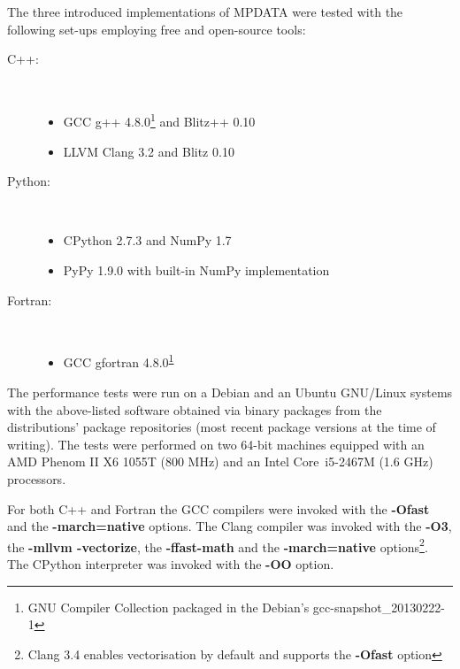 \documentclass[twocolumn]{article}
\newcommand{\prog}[1]{{\rm\bf#1}}
\begin{document}
  The three introduced implementations of MPDATA were tested with the following set-ups 
    employing free and open-source tools:
  \begin{description}
    \item[C++:]{~
      \begin{itemize}
        \item{GCC g++ 4.8.0\footnote{\label{fnt:gcc-snapshot}GNU Compiler Collection packaged in the Debian's gcc-snapshot\_20130222-1} 
          and Blitz++ 0.10}
        \item{LLVM Clang 3.2 and Blitz 0.10}
      \end{itemize}
    }
    \item[Python:]{~
      \begin{itemize}
        \item{CPython 2.7.3 and NumPy 1.7}
        \item{PyPy 1.9.0 with built-in NumPy implementation}
      \end{itemize}
    }
    \item[Fortran:]{~
      \begin{itemize}
        \item{GCC gfortran 4.8.0\textsuperscript{\ref{fnt:gcc-snapshot}}}
      \end{itemize}
    }
  \end{description}
  The performance tests were run on a Debian and an Ubuntu GNU/Linux systems with the above-listed software obtained 
    via binary packages from the distributions' package repositories (most recent package versions at the time of writing).
  The tests were performed on two 64-bit machines equipped with
    an AMD Phenom\textsuperscript{\texttrademark} II X6 1055T (800 MHz)
    and an Intel\textsuperscript{\textregistered} Core\textsuperscript{\texttrademark}~i5-2467M (1.6 GHz)
    processors.

  For both C++ and Fortran the GCC compilers were invoked with the \prog{-Ofast} and the 
    \prog{-march=native} options.
  The Clang compiler was invoked with the \prog{-O3}, the \prog{-mllvm -vectorize}, the \prog{-ffast-math} 
    and the \prog{-march=native} options\footnote{Clang 3.4 enables vectorisation by default and supports the \prog{-Ofast} option}.
  The CPython interpreter was invoked with the \prog{-OO} option.
\end{document}
